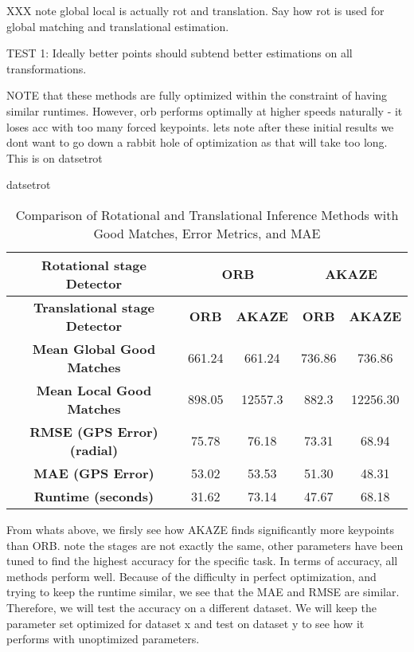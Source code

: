 XXX note global local is actually rot and translation. Say how rot is used for global matching and translational estimation. 

TEST 1:
 Ideally better points should subtend better estimations on all transformations. 


NOTE that these methods are fully optimized within the constraint of having similar runtimes. However, orb performs optimally at higher speeds naturally - it loses acc with too many forced keypoints. lets note after these initial results we dont want to go down a rabbit hole of optimization as that will take too long. 
This is on datsetrot


datsetrot
\begin{table}[H]
    \centering
    \begin{tabular}{|c|c|c|c|c|}
        \hline
        \textbf{Rotational stage Detector} & \multicolumn{2}{c|}{\textbf{ORB}} & \multicolumn{2}{c|}{\textbf{AKAZE}} \\ 
        \hline
        \textbf{Translational stage Detector} & \textbf{ORB} & \textbf{AKAZE} & \textbf{ORB} & \textbf{AKAZE} \\ 
        \hline
        \textbf{Mean Global Good Matches} & 661.24 & 661.24 & 736.86 & 736.86 \\ 
        \hline
        \textbf{Mean Local Good Matches} & 898.05 & 12557.3 & 882.3 & 12256.30 \\ 
        \hline
        \textbf{RMSE (GPS Error) (radial)} & 75.78 & 76.18 & 73.31 & 68.94 \\ 
        \hline
        \textbf{MAE (GPS Error)} & 53.02 & 53.53 & 51.30 & 48.31 \\ 
        \hline
        \textbf{Runtime (seconds)} & 31.62 & 73.14 & 47.67 & 68.18 \\ 
        \hline
    \end{tabular}
    \caption{Comparison of Rotational and Translational Inference Methods with Good Matches, Error Metrics, and MAE}
\end{table}


From whats above, we firsly see how AKAZE finds significantly more keypoints than ORB. note the stages are not exactly the same, other parameters have been tuned to find the highest accuracy for the specific task. 
In terms of accuracy, all methods perform well. Because of the difficulty in perfect optimization, and trying to keep the runtime similar, we see that the MAE and RMSE are similar. Therefore, we will test the accuracy on a different dataset. We will keep the parameter set optimized for dataset x and test on dataset y to see how it performs with unoptimized parameters. 




